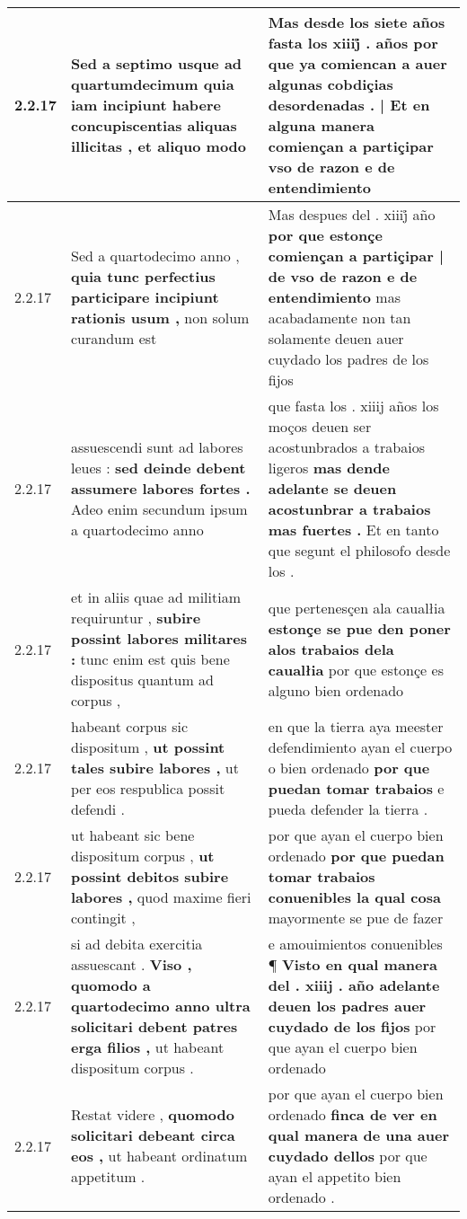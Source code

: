 \begin{tabular}{|p{1cm}|p{6.5cm}|p{6.5cm}|}
2.2.17 & Sed a septimo usque ad quartumdecimum \textbf{ quia iam incipiunt habere concupiscentias aliquas illicitas , } et aliquo modo & Mas desde los siete años fasta los xiiij̊ . años \textbf{ por que ya comiencan a auer algunas cobdiçias desordenadas . | Et en alguna manera comiençan a partiçipar vso de razon } e de entendimiento \\\hline
2.2.17 & Sed a quartodecimo anno , \textbf{ quia tunc perfectius participare incipiunt rationis usum , } non solum curandum est & Mas despues del . xiiij̊ año \textbf{ por que estonçe comiençan a partiçipar | de vso de razon e de entendimiento } mas acabadamente non tan solamente deuen auer cuydado los padres de los fijos \\\hline
2.2.17 & assuescendi sunt ad labores leues : \textbf{ sed deinde debent assumere labores fortes . } Adeo enim secundum ipsum a quartodecimo anno & que fasta los . xiiij años los moços deuen ser acostunbrados a trabaios ligeros \textbf{ mas dende adelante se deuen acostunbrar a trabaios mas fuertes . } Et en tanto que segunt el philosofo desde los . \\\hline
2.2.17 & et in aliis quae ad militiam requiruntur , \textbf{ subire possint labores militares : } tunc enim est quis bene dispositus quantum ad corpus , & que pertenesçen ala caualłia \textbf{ estonçe se pue den poner alos trabaios dela caualłia } por que estonçe es alguno bien ordenado \\\hline
2.2.17 & habeant corpus sic dispositum , \textbf{ ut possint tales subire labores , } ut per eos respublica possit defendi . & en que la tierra aya meester defendimiento ayan el cuerpo o bien ordenado \textbf{ por que puedan tomar trabaios } e pueda defender la tierra . \\\hline
2.2.17 & ut habeant sic bene dispositum corpus , \textbf{ ut possint debitos subire labores , } quod maxime fieri contingit , & por que ayan el cuerpo bien ordenado \textbf{ por que puedan tomar trabaios conuenibles la qual cosa } mayormente se pue de fazer \\\hline
2.2.17 & si ad debita exercitia assuescant . \textbf{ Viso , quomodo a quartodecimo anno ultra solicitari debent patres erga filios , } ut habeant dispositum corpus . & e amouimientos conuenibles ¶ \textbf{ Visto en qual manera del . xiiij . año adelante deuen los padres auer cuydado de los fijos } por que ayan el cuerpo bien ordenado \\\hline
2.2.17 & Restat videre , \textbf{ quomodo solicitari debeant circa eos , } ut habeant ordinatum appetitum . & por que ayan el cuerpo bien ordenado \textbf{ finca de ver en qual manera de una auer cuydado dellos } por que ayan el appetito bien ordenado . \\\hline

\end{tabular}
